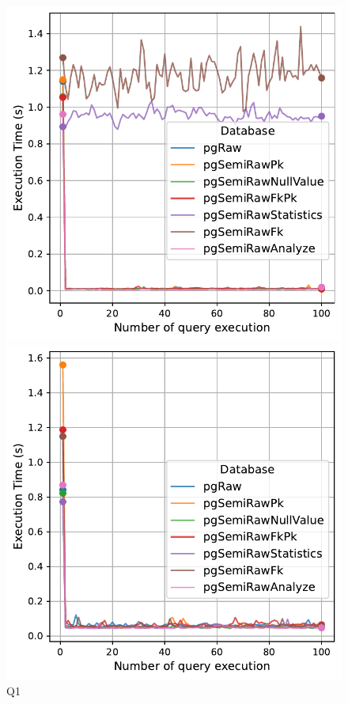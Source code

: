 \begin{figure}[h!]
\centering
\begin{minipage}[b]{0.45\linewidth}
    \centering
    \includegraphics[width=1.0\linewidth]{charts-eval-exp-time/execution_time_db_type_Q1.pdf}
    \caption*{Q1}
\end{minipage}
\hfill
\begin{minipage}[b]{0.45\linewidth}
    \centering
    \includegraphics[width=1.0\linewidth]{charts-eval-exp-time/execution_time_db_type_Q2.pdf}

\end{minipage}
\end{figure}
